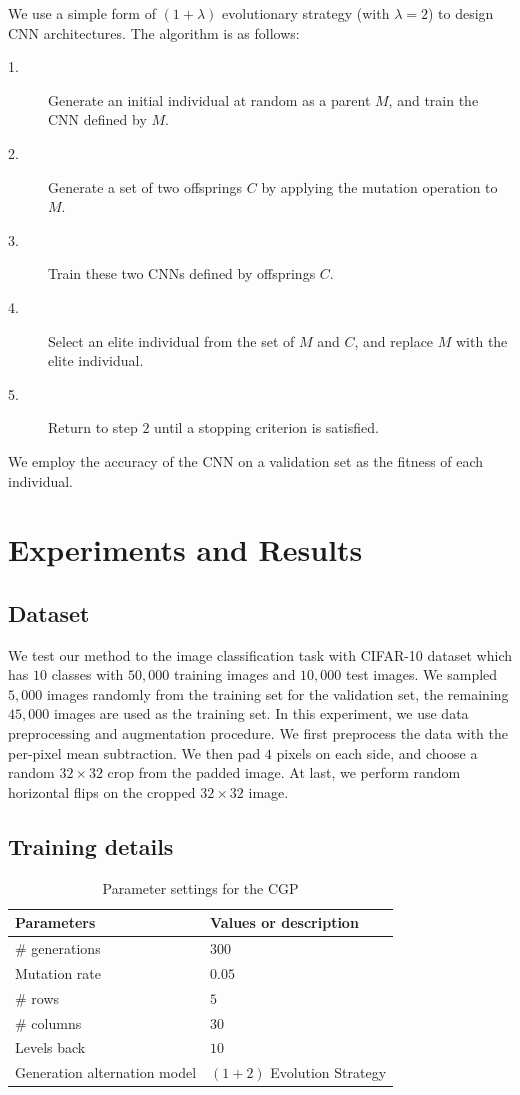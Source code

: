 We use a simple form of $(1+\lambda)$ evolutionary strategy (with $\lambda = 2$) to design CNN architectures.
The algorithm is as follows:
\begin{description}
  \item[1.] Generate an initial individual at random as a parent $M$, and train the CNN defined by $M$.
  \item[2.] Generate a set of two offsprings $C$ by applying the mutation operation to $M$.
  \item[3.] Train these two CNNs defined by offsprings $C$.
  \item[4.] Select an elite individual from the set of $M$ and $C$, and replace $M$ with the elite individual.
  \item[5.] Return to step $2$ until a stopping criterion is satisfied.
\end{description}
We employ the accuracy of the CNN on a validation set as the fitness of each individual.


\section{Experiments and Results}
\subsection{Dataset}
We test our method to the image classification task with CIFAR-10 dataset which has $10$ classes with $50,000$ training images and $10,000$ test images.
We sampled $5,000$ images randomly from the training set for the validation set, the remaining $45,000$ images are used as the training set.
In this experiment, we use data preprocessing and augmentation procedure.
We first preprocess the data with the per-pixel mean subtraction.
We then pad $4$ pixels on each side, and choose a random $32\times 32$ crop from the padded image.
At last, we perform random horizontal flips on the cropped $32 \times 32$ image. 

\subsection{Training details}

\begin{table}[t]
  \caption{Parameter settings for the CGP}
  \label{cgp_param}
  \begin{tabular}{l|l} \hline
    Parameters & Values or description \\ \hline
   \# generations & $300$ \\ 
   Mutation rate & $0.05$ \\
   \#  rows & $5$ \\
   \#  columns & $30$ \\
   Levels back & $10$ \\
   Generation alternation model & $(1+2)$ Evolution Strategy \\ \hline
  \end{tabular}
\end{table}

